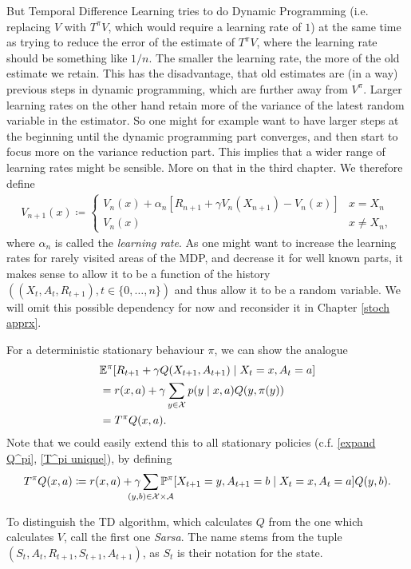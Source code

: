 But Temporal Difference Learning tries to do Dynamic Programming (i.e. replacing \(V\) with \(T^\pi V\), which would require a learning rate of \(1\)) at the same time as trying to reduce the error of the estimate of \(T^\pi V\), where the learning rate should be something like \(1/n\). The smaller the learning rate, the more of the old estimate we retain. This has the disadvantage, that old estimates are (in a way) previous steps in dynamic programming, which are further away from \(V^\pi\). Larger learning rates on the other hand retain more of the variance of the latest random variable in the estimator. So one might for example want to have larger steps at the beginning until the dynamic programming part converges, and then start to focus more on the variance reduction part. This implies that a wider range of learning rates might be sensible. More on that in the third chapter. We therefore define 
\begin{align}\label{TD learning}
	V_{n+1}(x) \coloneqq
	\begin{cases}
		V_n(x)+\alpha_n[R_{n+1}+\gamma V_n(X_{n+1}) - V_n(x)] & x=X_n\\
		V_n(x) & x\neq X_n,
	\end{cases}
\end{align}
where \(\alpha_n\) is called the \emph{learning rate}. As one might want to increase the learning rates for rarely visited areas of the MDP, and decrease it for well known parts, it makes sense to allow it to be a function of the history \(((X_t, A_t, R_{t+1}), t\in\{0,\dots, n\})\) and thus allow it to be a random variable. We will omit this possible dependency for now and reconsider it in Chapter \ref{stoch apprx}.

For a deterministic stationary behaviour \(\pi\), we can show the analogue 
\begin{align*}
	&\mathbb{E}^\pi[R_{t+1}+\gamma Q(X_{t+1}, A_{t+1})\mid X_t=x, A_t=a]\\
	&=r(x,a) +\gamma \sum_{y\in\mathcal{X}}p(y\mid x,a)Q(y,\pi(y))\\
	&= T^\pi Q(x,a).
\end{align*}
Note that we could easily extend this to all stationary policies (c.f. \ref{expand Q^pi}, \ref{T^pi unique}), by defining
\[
	T^\pi Q(x,a)\coloneqq r(x,a) +\gamma \smashoperator{\sum_{(y,b)\in\cX\times\cA}}\Pr^\pi[X_{t+1}=y,A_{t+1}=b\mid X_t=x,A_t=a]Q(y,b).
\]

To distinguish the TD algorithm, which calculates \(Q\) from the one which calculates \(V\), \citeauthor{suttonReinforcementLearningIntroduction1998} call the first one \emph{Sarsa}. The name stems from the tuple \((S_t, A_t,R_{t+1},S_{t+1},A_{t+1})\), as \(S_t\) is their notation for the state. 

